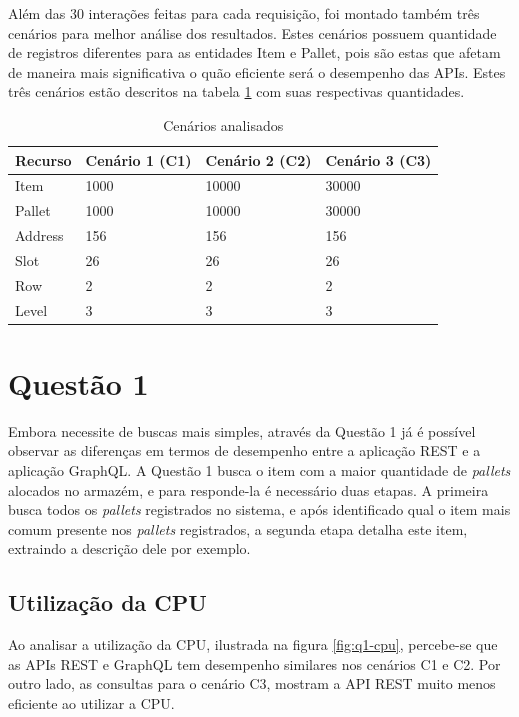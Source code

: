 Além das 30 interações feitas para cada requisição, foi montado também três cenários para melhor análise dos resultados. Estes cenários possuem quantidade de registros diferentes para as entidades \textup{Item} e \textup{Pallet}, pois são estas que afetam de maneira mais significativa o quão eficiente será o desempenho das APIs. Estes três cenários estão descritos na tabela \ref{tab:cenarios} com suas respectivas quantidades.

\begin{table}[htbp]
    \centering
    \begin{tabular}{| l | l | l | l|}
        \hline
        \textbf{Recurso} & \textbf{Cenário 1 (C1)} & \textbf{Cenário 2 (C2)} & \textbf{Cenário 3 (C3)} \\ \hline
        Item & 1000 & 10000 & 30000 \\ \hline
        Pallet & 1000 & 10000 & 30000 \\ \hline
        Address & 156 & 156 & 156 \\ \hline
        Slot & 26 & 26 & 26 \\ \hline
        Row & 2 & 2 & 2 \\ \hline
        Level & 3 & 3 & 3 \\ \hline
    \end{tabular}
    \caption{Cenários analisados} 
    \label{tab:cenarios}
\end{table}

\section{Questão 1}

Embora necessite de buscas mais simples, através da Questão 1 já é possível observar as diferenças em termos de desempenho entre a aplicação REST e a aplicação GraphQL. A Questão 1 busca o item com a maior quantidade de \textit{pallets} alocados no armazém, e para responde-la é necessário duas etapas. A primeira busca todos os \textit{pallets} registrados no sistema, e após identificado qual o item mais comum presente nos \textit{pallets} registrados, a segunda etapa detalha este item, extraindo a descrição dele por exemplo.

\subsection{Utilização da CPU}

Ao analisar a utilização da CPU, ilustrada na figura \ref{fig:q1-cpu}, percebe-se que as APIs REST e GraphQL tem desempenho similares nos cenários C1 e C2. Por outro lado, as consultas para o cenário C3, mostram a API REST muito menos eficiente ao utilizar a CPU.

